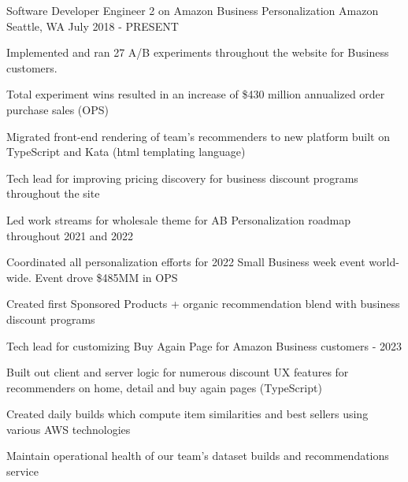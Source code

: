 

\begin{cventries}

  \cventry
    {Software Developer Engineer 2 on Amazon Business Personalization} %
    {Amazon} %
    {Seattle, WA} %
    {July 2018 - PRESENT} %
    {
      \begin{cvitems} %
        \item {Implemented and ran 27 A/B experiments throughout the website for Business customers.}
        \item {Total experiment wins resulted in an increase of \$430 million annualized order purchase sales (OPS)}
        \item {Migrated front-end rendering of team's recommenders to new platform built on TypeScript and Kata (html templating language)}
        \item {Tech lead for improving pricing discovery for business discount programs throughout the site}
        \item {Led work streams for wholesale theme for AB Personalization roadmap throughout 2021 and 2022}
        \item {Coordinated all personalization efforts for 2022 Small Business week event world-wide. Event drove \$485MM in OPS }
        \item {Created first Sponsored Products + organic recommendation blend with business discount programs}
        \item {Tech lead for customizing Buy Again Page for Amazon Business customers - 2023}
        \item {Built out client and server logic for numerous discount UX features for recommenders on home, detail and buy again pages (TypeScript)}
        \item {Created daily builds which compute item similarities and best sellers using various AWS technologies}
        \item {Maintain operational health of our team's dataset builds and recommendations service}
      \end{cvitems}
    }
    

\end{cventries}
